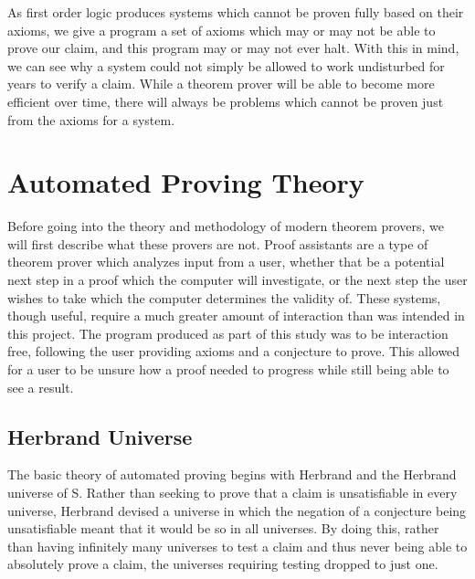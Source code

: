 As first order logic produces systems which cannot be proven fully based on their axioms, we give a program a set of axioms which may or may not be able to prove our claim, and this program may or may not ever halt. With this in mind, we can see why a system could not simply be allowed to work undisturbed for years to verify a claim. While a theorem prover will be able to become more efficient over time, there will always be problems which cannot be proven just from the axioms for a system.

\section{Automated Proving Theory}

Before going into the theory and methodology of modern theorem provers, we will first describe what these provers are not. Proof assistants are a type of theorem prover which analyzes input from a user, whether that be a potential next step in a proof which the computer will investigate, or the next step the user wishes to take which the computer determines the validity of. These systems, though useful, require a much greater amount of interaction than was intended in this project. The program produced as part of this study was to be interaction free, following the user providing axioms and a conjecture to prove. This allowed for a user to be unsure how a proof needed to progress while still being able to see a result.

\subsection{Herbrand Universe}
The basic theory of automated proving begins with Herbrand and the Herbrand universe of S. Rather than seeking to prove that a claim is unsatisfiable in every universe, Herbrand devised a universe in which the negation of a conjecture being unsatisfiable meant that it would be so in all universes. By doing this, rather than having infinitely many universes to test a claim and thus never being able to absolutely prove a claim, the universes requiring testing dropped to just one. 

